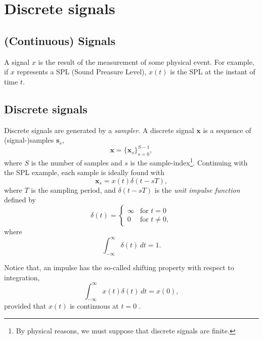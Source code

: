 \chapter{Discrete signals}

\section{(Continuous) Signals}

A signal $x$ is the result of the measurement of some physical
event. For example, if $x$ represents a SPL (Sound Preasure Level),
$x(t)$ is the SPL at the instant of time $t$.

\section{Discrete signals}
\label{sec:sampling}
Discrete signals are generated by a \emph{sampler}. A discrete signal $\bm{x}$ is a sequence of (signal-)samples $\bm{s}_s$,
\begin{equation}
  \bm{x} = \{\bm{x}_s\}_{s=0}^{S-1},
\end{equation}
where $S$ is the number of samples and $s$ is the
sample-index\footnote{By physical reasons, we must suppose that
  discrete signals are finite.}. Continuing with the SPL example, each
sample is ideally found with
\begin{equation}
  \bm{x}_s = x(t)\delta(t-sT),
\end{equation}
where $T$ is the sampling period, and
$\delta(t-sT)$ is the \emph{unit impulse function} defined by
\begin{equation}
\delta(t) =
\begin{cases}
\infty & \text{for } t = 0 \\
0 & \text{for } t \neq 0,
\end{cases}
\end{equation}
where
\begin{equation}
\int_{-\infty}^{\infty} \delta(t) \, dt = 1.
\end{equation}

Notice that, an impulse has the so-called shifting property with
respect to integration,
\begin{equation}
\int_{-\infty}^{\infty} x(t)\delta(t) \, dt = x(0),
\end{equation}
provided that $x(t)$ is continuous at $t=0$ \cite{gonzalez1992digital}.


